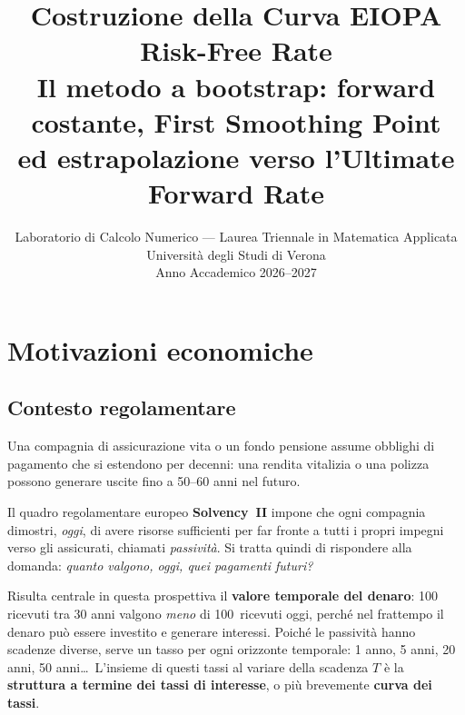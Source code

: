 \documentclass[11pt,a4paper]{article}
\title{%
  \textbf{Costruzione della Curva EIOPA Risk-Free Rate}\\[6pt]
  \large Il metodo a bootstrap: forward costante, First Smoothing Point\\[3pt]
  ed estrapolazione verso l'Ultimate Forward Rate\\[4pt]
}
\author{Laboratorio di Calcolo Numerico --- Laurea Triennale in Matematica Applicata\\
  Universit\`a degli Studi di Verona\\[2pt]
  Anno Accademico 2026--2027}
\date{}
\theoremstyle{plain}
\theoremstyle{definition}
\theoremstyle{remark}
\begin{document}
\maketitle
\tableofcontents
\newpage

\section{Motivazioni economiche}

\subsection{Contesto regolamentare}

Una compagnia di assicurazione vita o un fondo pensione assume obblighi di pagamento che si
estendono per decenni: una rendita vitalizia o una polizza possono generare uscite fino a
50--60 anni nel futuro.

Il quadro regolamentare europeo \textbf{Solvency~II} impone che ogni compagnia dimostri,
\emph{oggi}, di avere risorse sufficienti per far fronte a tutti i propri impegni verso gli
assicurati, chiamati \emph{passivit\`a}. Si tratta quindi di rispondere alla domanda: \emph{quanto
valgono, oggi, quei pagamenti futuri?}

Risulta centrale in questa prospettiva il \textbf{valore temporale del denaro}: 100\,\texteuro{}
ricevuti tra 30 anni valgono \emph{meno} di 100\,\texteuro{} ricevuti oggi, perch\'e nel
frattempo il denaro pu\`o essere investito e generare interessi. Poich\'e le passivit\`a hanno
scadenze diverse, serve un tasso per ogni orizzonte temporale: 1 anno, 5 anni, 20 anni, 50
anni\ldots\ L'insieme di questi tassi al variare della scadenza $T$ \`e la \textbf{struttura a
termine dei tassi di interesse}, o pi\`u brevemente \textbf{curva dei tassi}.
\end{document}
